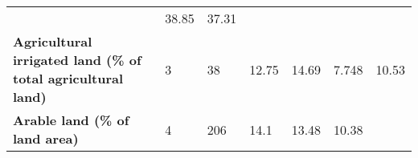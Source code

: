 \documentclass[
]{article}
\begin{document}
\begin{longtable}[]{@{}lllllll@{}}
\begin{minipage}[t]{0.12\columnwidth}
\end{minipage} & \begin{minipage}[t]{0.11\columnwidth}\raggedright
38.85\strut
\end{minipage} & \begin{minipage}[t]{0.11\columnwidth}\raggedright
37.31\strut
\end{minipage}\tabularnewline
\begin{minipage}[t]{0.19\columnwidth}\raggedright
\textbf{Agricultural irrigated land (\% of total agricultural
land)}\strut
\end{minipage} & \begin{minipage}[t]{0.08\columnwidth}\raggedright
3\strut
\end{minipage} & \begin{minipage}[t]{0.07\columnwidth}\raggedright
38\strut
\end{minipage} & \begin{minipage}[t]{0.12\columnwidth}\raggedright
12.75\strut
\end{minipage} & \begin{minipage}[t]{0.12\columnwidth}\raggedright
14.69\strut
\end{minipage} & \begin{minipage}[t]{0.11\columnwidth}\raggedright
7.748\strut
\end{minipage} & \begin{minipage}[t]{0.11\columnwidth}\raggedright
10.53\strut
\end{minipage}\tabularnewline
\begin{minipage}[t]{0.19\columnwidth}\raggedright
\textbf{Arable land (\% of land area)}\strut
\end{minipage} & \begin{minipage}[t]{0.08\columnwidth}\raggedright
4\strut
\end{minipage} & \begin{minipage}[t]{0.07\columnwidth}\raggedright
206\strut
\end{minipage} & \begin{minipage}[t]{0.12\columnwidth}\raggedright
14.1\strut
\end{minipage} & \begin{minipage}[t]{0.12\columnwidth}\raggedright
13.48\strut
\end{minipage} & \begin{minipage}[t]{0.11\columnwidth}\raggedright
10.38\strut
\end{minipage} & \begin{minipage}[t]{0.11\columnwidth}\raggedright

\end{minipage}
\end{longtable}
\end{document}
